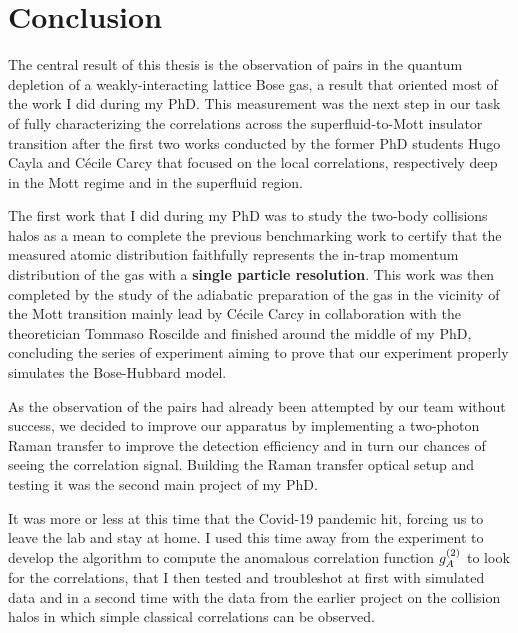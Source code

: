 \chapter*{Conclusion}

\label{chap:conclusion}

The central result of this thesis is the observation of \kmk pairs in the quantum depletion of a weakly-interacting lattice Bose gas, a result that oriented most of the work I did during my PhD. This measurement was the next step in our task of fully characterizing the correlations across the superfluid-to-Mott insulator transition after the first two works \cite{carcy2019momentum,cayla2020} conducted by the former PhD students Hugo Cayla and Cécile Carcy that focused on the local correlations, respectively deep in the Mott regime and in the superfluid region. 

The first work that I did during my PhD was to study the two-body collisions halos \cite{tenart2020two} as a mean to complete the previous benchmarking work \cite{cayla2018single} to certify that the measured atomic distribution faithfully represents the in-trap momentum distribution of the gas with a \textbf{single particle resolution}. This work was then completed by the study of the adiabatic preparation of the gas in the vicinity of the Mott transition \cite{carcy2021} mainly lead by Cécile Carcy in collaboration with the theoretician Tommaso Roscilde and finished around the middle of my PhD, concluding the series of experiment aiming to prove that our experiment properly simulates the Bose-Hubbard model.

As the observation of the \kmk pairs had already been attempted by our team without success, we decided to improve our apparatus by implementing a two-photon Raman transfer to improve the detection efficiency and in turn our chances of seeing the \kmk correlation signal. Building the Raman transfer optical setup and testing it was the second main project of my PhD. 

It was more or less at this time that the Covid-19 pandemic hit, forcing us to leave the lab and stay at home. I used this time away from the experiment to develop the algorithm to compute the anomalous correlation function $g^{(2)}_A$ to look for the \kmk correlations, that I then tested and troubleshot at first with simulated data and in a second time with the data from the earlier project on the collision halos in which simple classical \kmk correlations can be observed. 

